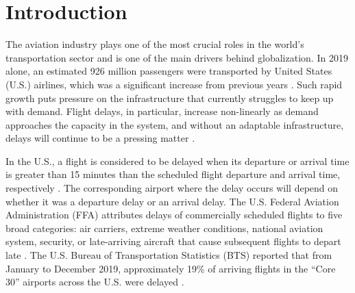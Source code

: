 \documentclass{article}
\begin{document}
\printAffiliationsAndNotice{}  %


\section{Introduction}
\label{introduction}
The aviation industry plays one of the most crucial roles in the world’s transportation sector and is one of the main drivers behind globalization. In 2019 alone, an estimated 926 million passengers were transported by United States (U.S.) airlines, which was a significant increase from previous years \cite{1_num_passengers_2019}. Such rapid growth puts pressure on the infrastructure that currently struggles to keep up with demand. Flight delays, in particular, increase non-linearly as demand approaches the capacity in the system, and without an adaptable infrastructure, delays will continue to be a pressing matter \cite{2_bell_2010}.

In the U.S., a flight is considered to be delayed when its departure or arrival time is greater than 15 minutes than the scheduled flight departure and arrival time, respectively \cite{3_bts_data}. The corresponding airport where the delay occurs will depend on whether it was a departure delay or an arrival delay. The U.S. Federal Aviation Administration (FFA) attributes delays of commercially scheduled flights to five broad categories: air carriers, extreme weather conditions, national aviation system, security, or late-arriving aircraft that cause subsequent flights to depart late \cite{4_dep_transportation}. The U.S. Bureau of Transportation Statistics (BTS) reported that from January to December 2019, approximately 19\% of arriving flights in the “Core 30” airports across the U.S. were delayed \cite{3_bts_data, 5_faa_core30}.
\end{document}
